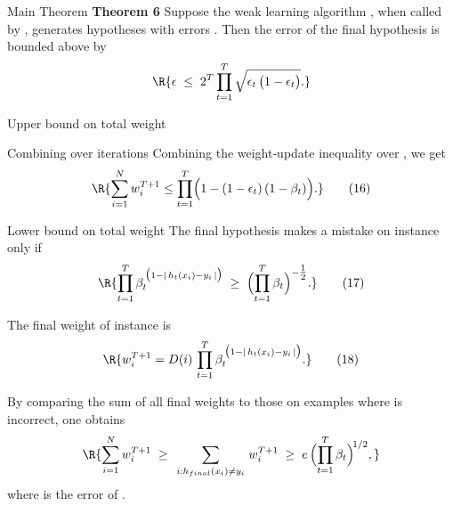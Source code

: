 \documentclass[handout]{beamer}
\begin{document}
\begin{frame}{Main Theorem}
  \textbf{Theorem 6} 
  Suppose the weak learning algorithm , 
  when called by , 
  generates hypotheses with errors . 
  Then the error 
  of the final hypothesis  is bounded above by
  \[
    \R{\epsilon \;\le\; 2^T \prod_{t=1}^T \sqrt{\epsilon_t \,\bigl(1 - \epsilon_t\bigr)}.}
  \]
\end{frame}

\begin{frame}{Upper bound on total weight}
  
\end{frame}

\begin{frame}{Combining over iterations}
Combining the weight‐update inequality over , we get 
\[
  \R{\sum_{i=1}^N w_i^{T+1} 
       \le \prod_{t=1}^T 
         \Bigl(1 - (1-\epsilon_t)\,(1-\beta_t)\Bigr).}
  \tag{16}
\]
\end{frame}

\begin{frame}{Lower bound on total weight}
The final hypothesis  makes a mistake on instance  only if
\[
  \R{
    \prod_{t=1}^T \beta_t^{\,\bigl(1-|\,h_t(x_i)-y_i\,|\bigr)}
    \;\ge\;
    \Bigl(\prod_{t=1}^T \beta_t\Bigr)^{-\tfrac12}.
  }
  \tag{17}
\]

The final weight of instance  is
\[
  \R{w_i^{T+1} = D(i)\,\prod_{t=1}^T \beta_t^{\,\bigl(1-|\,h_t(x_i)-y_i\,|\bigr)}.}
  \tag{18}
\]

By comparing the sum of all final weights to those on examples where  is incorrect, one obtains
\[
  \R{\sum_{i=1}^N w_i^{T+1}
       \;\ge\;
       \sum_{\,i : h_{final}(x_i)\neq y_i\,} w_i^{T+1}
       \;\ge\;
       e \,\Bigl(\prod_{t=1}^T \beta_t\Bigr)^{\!1/2},}
\]
where  is the error of . 
\end{frame}
\end{document}
